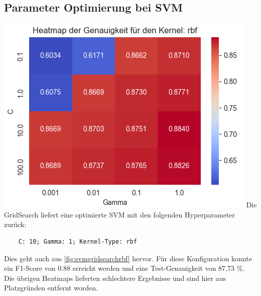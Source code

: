 \subsection{Parameter Optimierung bei SVM}
{
	\centering
	\includegraphics[width=1\linewidth]{images/svm_gridsearch_rbf}
	\label{fig:svmgridsearchrbf}
}
Die \glqq{}GridSearch\grqq{} liefert eine optimierte SVM mit den folgenden Hyperparameter zurück:
\begin{verbatim}
	C: 10; Gamma: 1; Kernel-Type: rbf
\end{verbatim}
 Dies geht auch aus \autoref{fig:svmgridsearchrbf} hervor. Für diese Konfiguration konnte ein F1-Score von 0.88 erreicht werden und eine Test-Genauigkeit von 87,73 \%.
 Die übrigen Heatmaps lieferten schlechtere Ergebnisse und sind hier aus Platzgründen entfernt worden.









